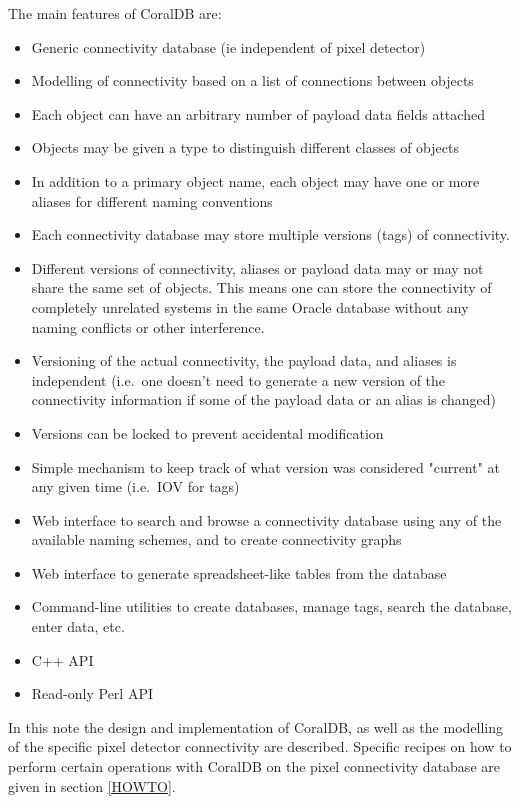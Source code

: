 The main features of CoralDB are:
\begin{itemize}
\item Generic connectivity database (ie independent of pixel detector)
\item Modelling of connectivity based on a list of connections between objects
\item Each object can have an arbitrary number of payload data fields attached
\item Objects may be given a type to distinguish different classes of objects
\item In addition to a primary object name, each object may have one or more
  aliases for different naming conventions
\item Each connectivity database may store multiple versions (tags) of connectivity.
\item Different versions of connectivity, aliases or payload data may or may not share the same set of
  objects. This means one can store the connectivity of completely
  unrelated systems in the same Oracle database without any naming conflicts or other interference.
\item Versioning of the actual connectivity, the payload data, and aliases is
  independent (i.e.\ one doesn't need to generate a new version of the connectivity
  information if some of the payload data or an alias is changed)
\item Versions can be locked to prevent accidental modification
\item Simple mechanism to keep track of what version was considered "current" at
  any given time (i.e.\ IOV for tags)
\item Web interface to search and browse a connectivity database using any of
  the available naming schemes, and to create connectivity graphs
\item Web interface to generate spreadsheet-like tables from the database
\item Command-line utilities to create databases, manage tags, search the
  database, enter data, etc.
\item C++ API
\item Read-only Perl API
\end{itemize}

In this note the design and implementation of CoralDB, as well as the
modelling of the specific pixel detector connectivity are
described. Specific recipes on how to perform certain operations with
CoralDB on the pixel connectivity database are given in section
\ref{HOWTO}.

